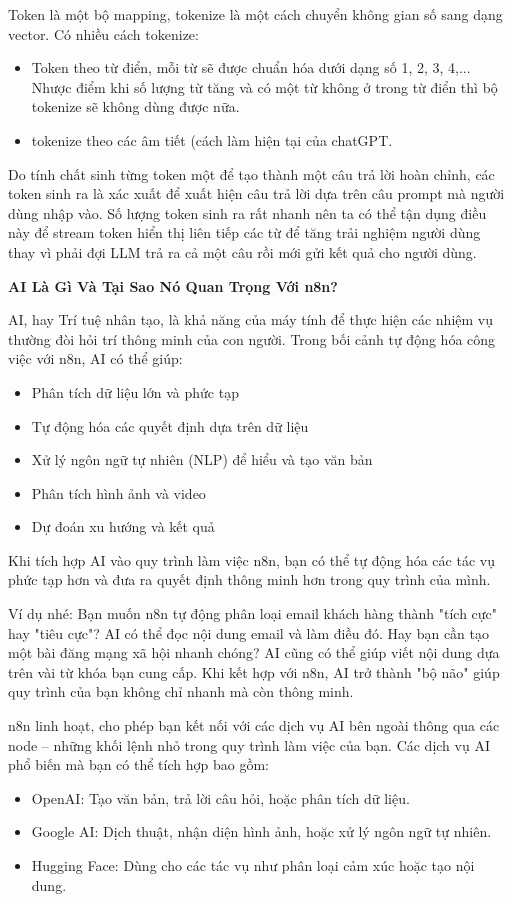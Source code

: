 Token là một bộ mapping, tokenize là một cách chuyển không gian số sang dạng vector. Có nhiều cách tokenize:
\begin{itemize}
    \item Token theo từ điển, mỗi từ sẽ được chuẩn hóa dưới dạng số 1, 2, 3, 4,... Nhược điểm khi số lượng từ tăng và có một từ không ở trong từ điển thì bộ tokenize sẽ không dùng được nữa.
    \item tokenize theo các âm tiết (cách làm hiện tại của chatGPT.
\end{itemize}

Do tính chất sinh từng token một để tạo thành một câu trả lời hoàn chỉnh, các token sinh ra là xác xuất để xuất hiện câu trả lời dựa trên câu prompt mà người dùng nhập vào. Số lượng token sinh ra rất nhanh nên ta có thể tận dụng điều này để stream token hiển thị liên tiếp các từ để tăng trải nghiệm người dùng thay vì phải đợi LLM trả ra cả một câu rồi mới gửi kết quả cho người dùng.


\textbf{AI Là Gì Và Tại Sao Nó Quan Trọng Với n8n?}


AI, hay Trí tuệ nhân tạo, là khả năng của máy tính để thực hiện các nhiệm vụ thường đòi hỏi trí thông minh của con người. Trong bối cảnh tự động hóa công việc với n8n, AI có thể giúp:
\begin{itemize}
    \item Phân tích dữ liệu lớn và phức tạp
    \item Tự động hóa các quyết định dựa trên dữ liệu
    \item Xử lý ngôn ngữ tự nhiên (NLP) để hiểu và tạo văn bản
    \item Phân tích hình ảnh và video
    \item Dự đoán xu hướng và kết quả
\end{itemize}

Khi tích hợp AI vào quy trình làm việc n8n, bạn có thể tự động hóa các tác vụ phức tạp hơn và đưa ra quyết định thông minh hơn trong quy trình của mình.

Ví dụ nhé: Bạn muốn n8n tự động phân loại email khách hàng thành "tích cực" hay "tiêu cực"? AI có thể đọc nội dung email và làm điều đó. Hay bạn cần tạo một bài đăng mạng xã hội nhanh chóng? AI cũng có thể giúp viết nội dung dựa trên vài từ khóa bạn cung cấp. Khi kết hợp với n8n, AI trở thành "bộ não" giúp quy trình của bạn không chỉ nhanh mà còn thông minh.

n8n linh hoạt, cho phép bạn kết nối với các dịch vụ AI bên ngoài thông qua các node – những khối lệnh nhỏ trong quy trình làm việc của bạn. Các dịch vụ AI phổ biến mà bạn có thể tích hợp bao gồm:
\begin{itemize}
    \item OpenAI: Tạo văn bản, trả lời câu hỏi, hoặc phân tích dữ liệu.
    \item Google AI: Dịch thuật, nhận diện hình ảnh, hoặc xử lý ngôn ngữ tự nhiên.
    \item Hugging Face: Dùng cho các tác vụ như phân loại cảm xúc hoặc tạo nội dung.
\end{itemize}


